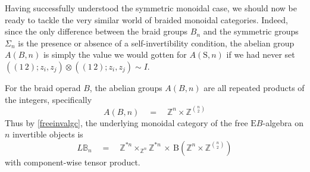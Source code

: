 \documentclass{amsbook} %
\numberwithin{section}{chapter}
\begin{document}
Having successfully understood the symmetric monoidal case, we should now be ready to tackle the very similar world of braided monoidal categories. Indeed, since the only difference between the braid groups $B_{n}$ and the symmetric groups $\Sigma_{n}$ is the presence or absence of a self-invertibility condition, the abelian group $A(B,n)$ is simply the value we would gotten for $A(\mathrm{S},n)$ if we had never set $((1 \, 2); z_i, z_j) \otimes ((1 \, 2); z_i, z_j) \sim I$.

\begin{prop} \label{invbraidcat} For the braid operad $B$, the abelian groups $A(B,n)$ are all repeated products of the integers, specifically
\[ A(B,n) \quad = \quad \mathbb{Z}^{n} \times \mathbb{Z}^{{n}\choose{2}} \]
Thus by \cref{freeinvalgc}, the underlying monoidal category of the free $\mathrm{E}B$-algebra on $n$ invertible objects is
\[ L\mathbb{B}_n \quad = \quad \mathbb{Z}^{\ast n} \times_{\mathbb{Z}^n} \mathbb{Z}^{\ast n}  \, \times \, \mathrm{B}(\mathbb{Z}^{n} \times \mathbb{Z}^{{n}\choose{2}} ) \]
with component-wise tensor product.
\end{prop}
\end{document}
